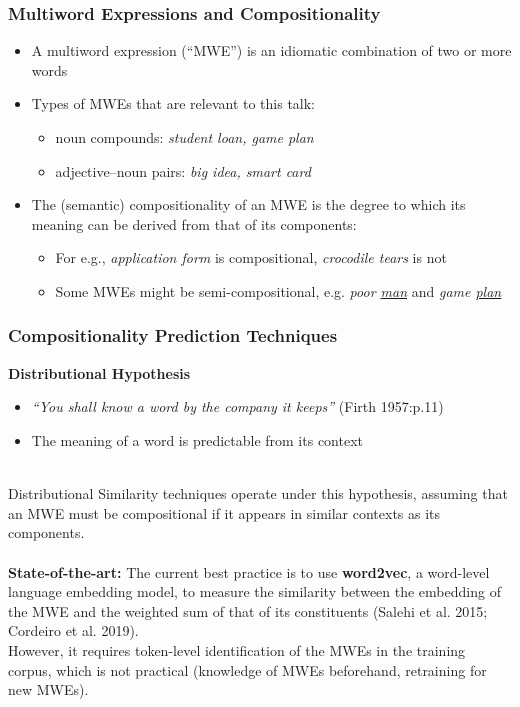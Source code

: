 \documentclass[english,svgnames,notes=hide,14pt,aspectratio=169]{beamer}
\newcommand{\lex}[1]{\textit{#1}\xspace}
\begin{document}
\begin{frame}
\titlepage %
\end{frame}


\begin{frame}
\frametitle{Multiword Expressions and Compositionality}


\begin{itemize}
\item A multiword expression (``MWE'') is an idiomatic combination of two or more
  words
\item Types of MWEs that are relevant to this talk:
  \begin{itemize}
  \item noun compounds: \lex{student loan, game plan}
  \item adjective--noun pairs: \lex{big idea, smart card}
  \end{itemize}
\item The (semantic) compositionality of an MWE is the degree to which
  its meaning can be derived from that of its components:
  \begin{itemize}
  \item For e.g., \lex{application form} is compositional, \lex{crocodile tears} is not
  \item Some MWEs might be semi-compositional, e.g. \lex{poor \uline{man}} and \lex{game \uline{plan}}
  \end{itemize}
\end{itemize}

\end{frame}

\begin{frame}
\frametitle{Compositionality Prediction Techniques}
\textbf{Distributional Hypothesis}
\begin{itemize}
    \item \textit{``You shall know a word by the company it keeps''} (Firth 1957:p.11)
    \item The meaning of a word is predictable from its context
\end{itemize} \\
Distributional Similarity techniques operate under this hypothesis, assuming that an MWE must be compositional if it appears in similar contexts as its components.
\\~\\
\textbf{State-of-the-art:} The current best practice is to use \textbf{word2vec}, a word-level language embedding model, to measure the similarity between
the embedding of the MWE and the weighted sum of that of its constituents (Salehi et al. 2015; Cordeiro et al. 2019). \\
However, it requires token-level identification of the MWEs in the training corpus, which is not practical (knowledge of MWEs beforehand, retraining for new MWEs).
\end{frame}
\end{document}
